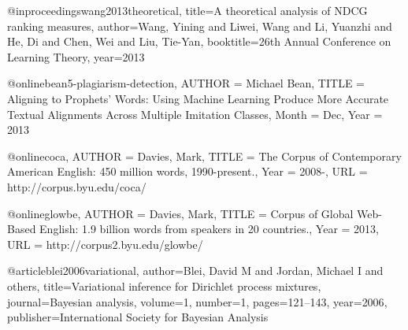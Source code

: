 @inproceedings{wang2013theoretical,
  title={A theoretical analysis of NDCG ranking measures},
  author={Wang, Yining and Liwei, Wang and Li, Yuanzhi and He, Di and Chen, Wei and Liu, Tie-Yan},
  booktitle={26th Annual Conference on Learning Theory},
  year={2013}
}

@online{bean5-plagiarism-detection,
	AUTHOR = {Michael Bean},
	TITLE = {Aligning to Prophets’ Words: Using Machine Learning Produce More Accurate Textual Alignments Across Multiple Imitation Classes},
	Month = Dec,
	Year = {2013}
}

@online{coca,
	AUTHOR = {Davies, Mark},
	TITLE = {The Corpus of Contemporary American English: 450 million words, 1990-present.},
	Year = {2008-},
	URL = {http://corpus.byu.edu/coca/}
}

@online{glowbe,
	AUTHOR = {Davies, Mark},
	TITLE = {Corpus of Global Web-Based English: 1.9 billion words from speakers in 20 countries.},
	Year = {2013},
	URL = {http://corpus2.byu.edu/glowbe/}
}

@article{blei2006variational,
    author={Blei, David M and Jordan, Michael I and others},
    title={Variational inference for Dirichlet process mixtures},
    journal={Bayesian analysis},
    volume={1},
    number={1},
    pages={121--143},
    year={2006},
    publisher={International Society for Bayesian Analysis}
}

